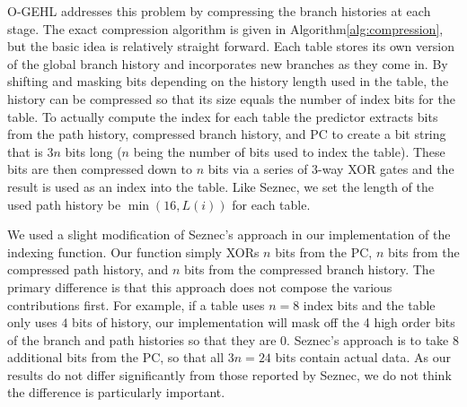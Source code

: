 O-GEHL addresses this problem by compressing the branch histories at each stage.\cite{cbp1}\cite{ogehl}\cite{seznec2005analysis} The exact compression algorithm is given in Algorithm\ref{alg:compression}, but the basic idea is relatively straight forward.  Each table stores its own version of the global branch history and incorporates new branches as they come in.  By shifting and masking bits depending on the history length used in the table, the history can be compressed so that its size equals the number of index bits for the table.  To actually compute the index for each table the predictor extracts bits from the path history, compressed branch history, and PC to create a bit string that is $3n$ bits long ($n$ being the number of bits used to index the table).  These bits are then compressed down to $n$ bits via a series of 3-way XOR gates and the result is used as an index into the table.  Like Seznec, we set the length of the used path history be $\min(16, L(i))$ for each table.

We used a slight modification of Seznec's approach in our implementation of the indexing function.  Our function simply XORs $n$ bits from the PC, $n$ bits from the compressed path history, and $n$ bits from the compressed branch history.  The primary difference is that this approach does not compose the various contributions first.  For example, if a table uses $n=8$ index bits and the table only uses $4$ bits of history, our implementation will mask off the 4 high order bits of the branch and path histories so that they are 0.  Seznec's approach is to take 8 additional bits from the PC, so that all $3n=24$ bits contain actual data.  As our results do not differ significantly from those reported by Seznec, we do not think the difference is particularly important.
